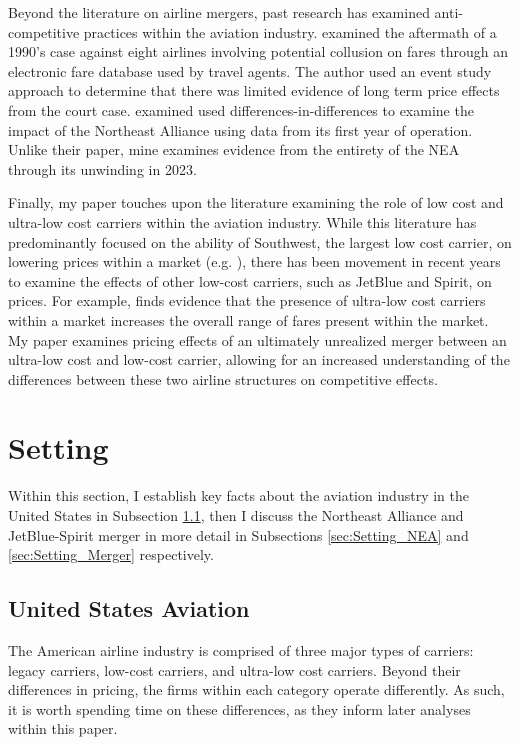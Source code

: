 \documentclass{article}
\begin{document}
	Beyond the literature on airline mergers, past research has examined anti-competitive practices within the aviation industry. \citet{miller_did_2010} examined the aftermath of a 1990's case against eight airlines involving potential collusion on fares through an electronic fare database used by travel agents. The author used an event study approach to determine that there was limited evidence of long term price effects from the court case. \citet{zou_assessing_2023} examined used differences-in-differences to examine the impact of the Northeast Alliance using data from its first year of operation. Unlike their paper, mine examines evidence from the entirety of the NEA through its unwinding in 2023. 
	
	Finally, my paper touches upon the literature examining the role of low cost and ultra-low cost carriers within the aviation industry. While this literature has predominantly focused on the ability of Southwest, the largest low cost carrier, on lowering prices within a market (e.g. \citet{windle_short_1995, morrison_actual_2001,  goolsbee_how_2008}), there has been movement in recent years to examine the effects of other low-cost carriers, such as JetBlue and Spirit, on prices. For example, \citet{shrago_spirit_2024} finds evidence that the presence of ultra-low cost carriers within a market increases the overall range of fares present within the market. My paper examines pricing effects of an ultimately unrealized merger between an ultra-low cost and low-cost carrier, allowing for an increased understanding of the differences between these two airline structures on competitive effects.  
	
	\section{Setting}
	\label{sec:Setting}
	
	Within this section, I establish key facts about the aviation industry in the United States in Subsection \ref{sec:Setting_Aviation}, then I discuss the Northeast Alliance and JetBlue-Spirit merger in more detail in Subsections \ref{sec:Setting_NEA} and \ref{sec:Setting_Merger} respectively.
	
	\subsection{United States Aviation}
	\label{sec:Setting_Aviation}
	The American airline industry is comprised of three major types of carriers: legacy carriers, low-cost carriers, and ultra-low cost carriers. Beyond their differences in pricing, the firms within each category operate differently. As such, it is worth spending time on these differences, as they inform later analyses within this paper.
	
\end{document}

